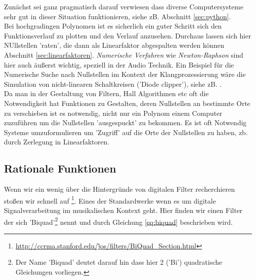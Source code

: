 

Zunächst sei ganz pragmatisch darauf verwiesen dass diverse Computersysteme sehr gut in dieser Situation funktionieren, siehe zB. Abschnitt \ref{sec:python}. \\
Bei hochgradingen Polynomen ist es sicherlich ein guter Schritt sich den Funktionsverlauf zu plotten und den Verlauf anzusehen. Durchaus lassen sich hier NUllstellen 'raten', die dann als Linearfaktor abgespalten werden können Abschnitt \ref{sec:linearfaktoren}. \emph{Numerische Verfahren} wie \emph{Newton-Raphson} sind hier auch äußerst wichtig, speziell in der Audio Technik. Ein Beispiel für die Numerische Suche nach Nullstellen im Kontext der Klangprozessierung wäre die Simulation von nicht-linearen Schaltkreisen ('Diode clipper'), siehe zB. \cite{holmes2015improving}. \\

Da man in der Gestaltung von Filtern, Hall Algorithmen etc oft die Notwendigkeit hat Funktionen zu Gestalten, deren Nullstellen an bestimmte Orte zu verschieben ist es notwendig, nicht nur ein Polynom einem Computer zuzuführen um die Nullstellen 'ausgespuckt' zu bekommen. Es ist oft Notwendig Systeme umzuformulieren um 'Zugriff' auf die Orte der Nullstellen zu haben, zb. durch Zerlegung in Linearfaktoren. 


\subsection{Rationale Funktionen}

Wenn wir ein wenig über die Hintergründe von digitalen Filter recherchieren stoßen wir schnell auf 
\cite{FILTERSWEB07}\footnote{\href{http://ccrma.stanford.edu/\~jos/filters/BiQuad\_Section.html}{http://ccrma.stanford.edu/\~jos/filters/BiQuad\_Section.html}}. Eines der Standardwerke wenn es um digitale Signalverarbeitung im musikalischen Kontext geht. Hier finden wir einen Filter der sich 'Biquad'\footnote{Der Name 'Biquad' deutet darauf hin dass hier 2 ('Bi') quadratische Gleichungen vorliegen.} nennt und durch Gleichung \ref{eq:biquad} beschrieben wird.

% 

